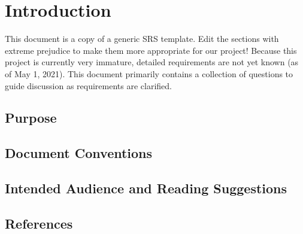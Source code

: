 \chapter{Introduction}
\label{chapt-introductin}

This document is a copy of a generic SRS template. Edit the sections with extreme prejudice to make them more appropriate for our project! Because this project is currently very immature, detailed requirements are not yet known (as of May 1, 2021). This document primarily contains a collection of questions to guide discussion as requirements are clarified.

\section{Purpose}

\section{Document Conventions}
\section{Intended Audience and Reading Suggestions}

\section{References}
